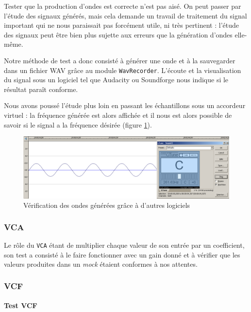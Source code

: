 Tester que la production d'ondes est correcte n'est pas aisé. On
peut passer par l'étude des signaux générés, mais cela demande un
travail de traitement du signal important qui ne nous paraissait
pas forcément utile, ni très pertinent : l'étude des signaux peut
être bien plus sujette aux erreurs que la génération d'ondes
elle-même.

Notre méthode de test a donc consisté à générer une onde et à la
sauvegarder dans un fichier WAV grâce au module \verb!WavRecorder!.
L'écoute et la visualisation du signal sous un logiciel tel que
Audacity ou Soundforge nous indique si le résultat paraît
conforme.

Nous avons poussé l'étude plus loin en passant les échantillons
sous un accordeur virtuel : la fréquence générée est alors affichée
et il nous est alors possible de savoir si le signal a la fréquence
désirée (figure \ref{fig:accordeur}).

\begin{figure}[htb]
\centering
\includegraphics[width=17cm]{../img/png/testWaveGeneratorSinus.png}
\caption{Vérification des ondes générées grâce à d'autres logiciels}
\label{fig:accordeur}
\end{figure}

\subsubsection{VCA}
Le rôle du \verb!VCA! étant de multiplier chaque valeur de son entrée par un coefficient, son test a consisté à le faire fonctionner avec un gain donné et à vérifier que les valeurs produites dans un \emph{mock} étaient conformes à nos attentes.

\subsubsection{VCF}

\paragraph{Test VCF}

